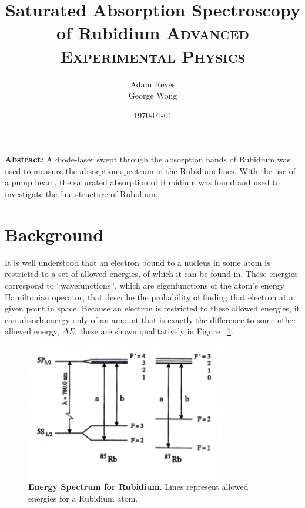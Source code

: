 \documentclass[paper=a4, fontsize=11pt]{scrartcl} %
\title{	
Saturated Absorption Spectroscopy of Rubidium
\horrule{0.5pt}
\normalfont \normalsize 
\textsc{Advanced Experimental Physics }
}
\author{Adam Reyes \\ George Wong} %
\date{\normalsize\today} %
\numberwithin{equation}{section}
\numberwithin{figure}{section}
\numberwithin{table}{section}
\begin{document}
\maketitle
\noindent\textbf{Abstract:}
A diode-laser swept through the absorption bands of Rubidium was used
to measure the absorption spectrum of the Rubidium lines. With the use
of a pump beam, the saturated absorption of Rubidium was found and
used to investigate the fine structure of Rubidium. 


\section{Background}


\indent It is well understood that an electron bound to a nucleus in
some atom is restricted to a set of allowed energies, of which it can
be found in. These energies correspond to ``wavefunctions'', which are
eigenfunctions of the atom's energy Hamiltonian operator, that
describe the probability of finding that electron at a given point in
space. Because an electron is restricted to these allowed energies, it
can absorb energy only of an amount that is exactly the difference to
some other allowed energy, $\Delta E$, these are shown qualitatively
in Figure ~\ref{fig:energies}. 

 \begin{figure}[h] \begin{center}
  \includegraphics[height=60mm]{energy.png}
  \caption{\textbf{Energy Spectrum for Rubidium}\cite{caltech}. Lines
    represent allowed energies for a Rubidium atom. }
  \label{fig:energies}
\end{center} \end{figure}
\end{document}
